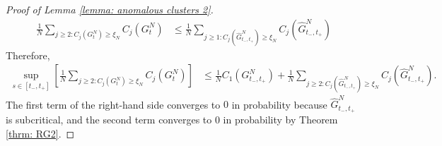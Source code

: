 \begin{proof}[Proof of Lemma \ref{lemma: anomalous clusters 2}]
\begin{equation}
\begin{split}
\frac{1}{N}\sum_{j\geq 2: C_j(G^N_t)\geq \xi_N} C_j(G^N_t) & \leq \frac{1}{N}\sum_{j\geq 1: C_j(\widehat{G}^N_{t_-,t_+})\geq \xi_N} C_j(\widehat{G}^N_{t_-,t_+}) 
\end{split} \end{equation} Therefore, \begin{equation}\begin{split}
    \sup_{s\in [t_-, t_+]} \left[\frac{1}{N}\sum_{j\geq 2: C_j(G^N_t)\geq \xi_N} C_j(G^N_t)\right] & \leq \frac{1}{N}C_1(G^N_{t_-, t_+})+\frac{1}{N}\sum_{j\geq 2: C_j(\widehat{G}^N_{t_-,t_+})\geq \xi_N} C_j(\widehat{G}^N_{t_-,t_+}).
\end{split} \end{equation} The first term of the right-hand side converges to $0$ in probability  because $\widehat{G}^N_{t_-,t_+}$ is subcritical, and the second term converges to $0$ in probability by Theorem \ref{thrm: RG2}. \end{proof} 
